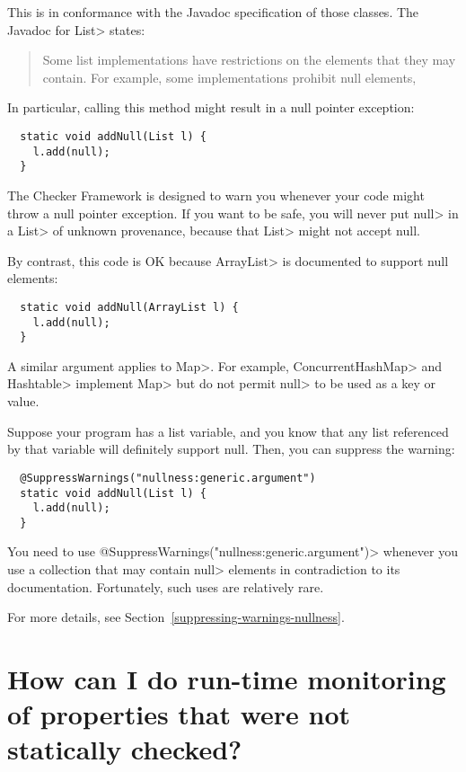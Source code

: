 This is in conformance with the Javadoc specification of those classes.
The Javadoc for \<List> states:

\begin{quote}
  Some list implementations have restrictions on the elements that they may
  contain. For example, some implementations prohibit null elements,
\end{quote}

In particular, calling this method might result in a null pointer exception:

\begin{Verbatim}
  static void addNull(List l) {
    l.add(null);
  }
\end{Verbatim}

The Checker Framework is designed to warn you whenever your code might
throw a null pointer exception.  If you want to be safe, you will never put
\<null> in a \<List> of unknown provenance, because that \<List> might not
accept null.

By contrast, this code is OK because \<ArrayList> is documented to support
null elements:

\begin{Verbatim}
  static void addNull(ArrayList l) {
    l.add(null);
  }
\end{Verbatim}

A similar argument applies to \<Map>.
For example, \<ConcurrentHashMap> and \<Hashtable> implement \<Map> but do
not permit \<null> to be used as a key or value.

Suppose your program has a list variable, and you know that any list referenced
by that variable will
definitely support null.  Then, you can suppress the warning:

\begin{Verbatim}
  @SuppressWarnings("nullness:generic.argument")
  static void addNull(List l) {
    l.add(null);
  }
\end{Verbatim}

\noindent
You need to use \<@SuppressWarnings("nullness:generic.argument")>
whenever you use a collection that may contain \<null> elements in
contradiction to its documentation.  Fortunately, such uses are relatively
rare.

For more details, see Section~\ref{suppressing-warnings-nullness}.


\section{How can I do run-time monitoring of properties that were not statically checked?\label{faq-run-time-checking}}

